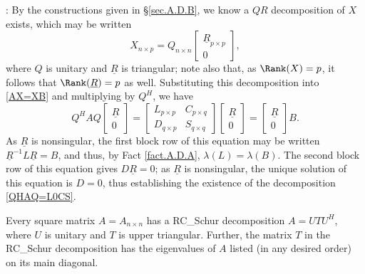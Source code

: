 \/: By the constructions given in \S \ref{sec.A.D.B}, we
know a $QR$ decomposition of $X$ exists, which may be written
\begin{equation*} X_{n\times p}=Q_{n\times n}\begin{bmatrix} \underline{R}_{p\times p} \\ 0 \end{bmatrix},
\end{equation*}
where $Q$ is unitary and $\underline{R}$ is triangular; note also
that, as $\Rank(X)=p$, it follows that $\Rank(\underline{R})=p$ as
well.  Substituting this decomposition into \eqref{AX=XB} and
multiplying by $Q^{H}$, we have
\begin{equation*}
Q^{H} A Q \begin{bmatrix} \underline{R} \\ 0 \end{bmatrix}
=\begin{bmatrix} L_{p\times p} & C_{p\times q} \\ D_{q\times p} & S_{q \times q} \end{bmatrix} \begin{bmatrix} \underline{R} \\ 0 \end{bmatrix}
=\begin{bmatrix} \underline{R} \\ 0 \end{bmatrix} B.
\end{equation*}
As $\underline{R}$ is nonsingular, the first block row of this
equation may be written $\underline{R}^{-1}L\underline{R}=B$, and
thus, by Fact \ref{fact.A.D.A}, $\lambda(L)=\lambda(B)$.  The second
block row of this equation gives $D \underline{R}=0$; as
$\underline{R}$ is nonsingular, the unique solution of this equation
is $D=0$, thus establishing the existence of the decomposition
\eqref{QHAQ=L0CS}.   \endproof

\begin{fact} \label{fact.A.D.C.Bb} Every square
matrix $A=A_{n\times n}$ has a RC_Schur decomposition $A=U T U^{H}$,
where $U$ is unitary and $T$ is upper triangular.  Further, the matrix
$T$ in the RC_Schur decomposition has the eigenvalues of $A$ listed (in
any desired order) on its main diagonal.
\end{fact}


